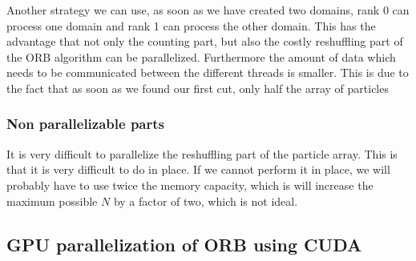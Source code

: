 \documentclass[]{article}
\begin{document}
Another strategy we can use, as soon as we have created two domains, rank 0 can process one domain and rank 1 can process the other domain. This has the advantage that not only the counting part, but also the costly reshuffling part of the ORB algorithm can be parallelized. Furthermore the amount of data which needs to be communicated between the different threads is smaller. This is due to the fact that as soon as we found our first cut, only half the array of particles 

\vspace{5mm}

\subsubsection{Non parallelizable parts}
It is very difficult to parallelize the reshuffling part of the particle array. This is that it is very difficult to do in place. If we cannot perform it in place, we will probably have to use twice the memory capacity, which is will increase the maximum possible $N$ by a factor of two, which is not ideal.


\subsection{GPU parallelization of ORB using CUDA }



\end{document}
